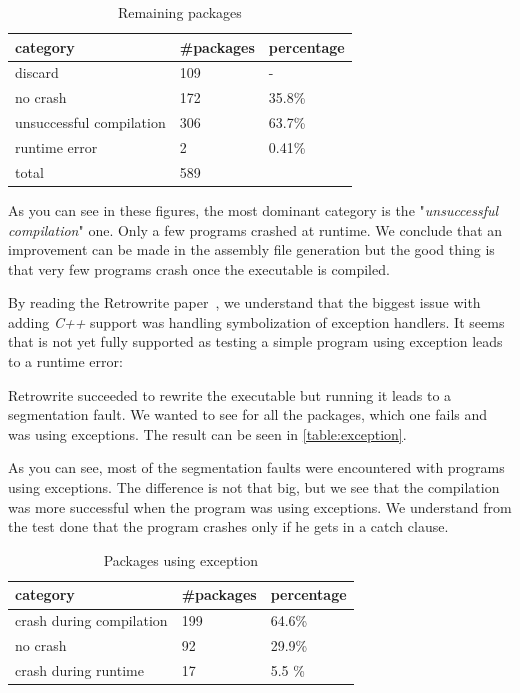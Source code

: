 \documentclass[a4paper,11pt,oneside]{report}
\newcommand{\sysname}{Retrowrite\xspace}
\begin{document}
\begin{table}[H]
    \centering
    \begin{tabular}{lll}
        \hline
        category                & \#packages & percentage \\
        \hline
        discard                  & 109 & -  \\
        no crash                 & 172 & 35.8\% \\
        unsuccessful compilation & 306 & 63.7\% \\
        runtime error            & 2   & 0.41\% \\
        \hline
        total                    & 589  \\
        \hline
    \end{tabular}
    \caption{Remaining packages}
    \label{table:remaining}
\end{table}

As you can see in these figures, the most dominant category is the
"\textit{unsuccessful compilation}" one. Only a few programs crashed at
runtime. We conclude that an improvement can be made in the assembly file
generation but the good thing is that very few programs crash once the
executable is compiled.  

By reading the \sysname paper~\cite{dinesh20oakland}, we understand that
the biggest issue with adding \textit{C++} support was handling symbolization
of exception handlers. It seems that is not yet fully supported as testing a
simple program using exception leads to a runtime error:



Retrowrite succeeded to rewrite the executable but running it leads to a
segmentation fault.
We wanted to see for all the packages, which one fails and was using
exceptions. The result can be seen in \autoref{table:exception}.

As you can see, most of the segmentation faults were encountered with programs
using exceptions. The difference is not that big, but we see that the compilation
was more successful when the program was using exceptions. We understand from
the test done that the program crashes only if he gets in a catch clause.


\begin{table}[H]
    \centering
    \begin{tabular}{lll} 
        \hline
        category                & \#packages & percentage \\ 
        \hline
        crash during compilation & 199 & 64.6\%      \\
        no crash                 & 92  & 29.9\%       \\
        crash during runtime     & 17  & 5.5 \%       \\
        \hline
    \end{tabular}
    \caption{Packages using exception}
    \label{table:exception}
\end{table}
\end{document}
